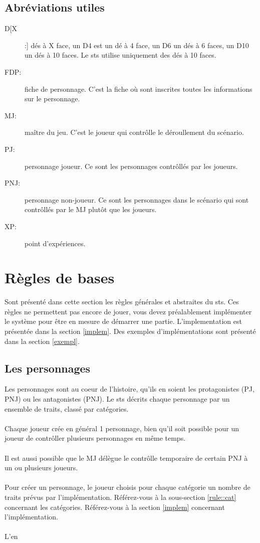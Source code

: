 \documentclass[a4paper,10pt,twoside,twocolumn]{article}
\begin{document}
 \subsection{Abréviations utiles}
 
\begin{description}
 \item[D[X]:] dés à X face, un D4 est un dé à 4 face, un D6 un dés à 6 faces, un D10 un dés à 10 faces. Le sts utilise uniquement des dés à 10 faces.
 \item[FDP:] fiche de personnage. C'est la fiche où sont inscrites toutes les informations sur le personnage.
 \item[MJ:] maître du jeu. C'est le joueur qui contrôlle le déroullement du scénario.
 \item[PJ:] personnage joueur. Ce sont les personnages contrôllés par les joueurs.
 \item[PNJ:] personnage non-joueur. Ce sont les personnages dans le scénario qui sont contrôllés par le MJ plutôt que les joueurs.
 \item[XP:] point d'expériences.
\end{description}
 
 \section{Règles de bases}
 \label{rule}
 Sont présenté dans cette section les règles générales et abstraites du sts. Ces règles ne permettent pas encore de jouer, vous devez préalablement implémenter le système pour être en mesure de démarrer une partie. L'implementation est présentée dans la section \ref{implem}. Des exemples d'implémentations sont présenté dans la section \ref{exempl}.
 
 \subsection{Les personnages}
 \label{rule::char}
  Les personnages sont au coeur de l'histoire, qu'ils en soient les protagonistes (PJ, PNJ) ou les antagonistes (PNJ). Le sts décrits chaque personnage par un ensemble de traits, classé par catégories.\\
  \\
  Chaque joueur crée en général 1 personnage, bien qu'il soit possible pour un joueur de contrôller plusieurs personnages en même temps.\\
  \\
  Il est aussi possible que le MJ délègue le contrôlle temporaire de certain PNJ à un ou plusieurs joueurs.\\
  \\
  Pour créer un personnage, le joueur choisis pour chaque catégorie un nombre de traits prévus par l'implémentation. Référez-vous à la sous-section \ref{rule::cat} concernant les catégories. Référez-vous à la section \ref{implem} concernant l'implémentation.\\
  \\
  L'en %
 
\end{document}
